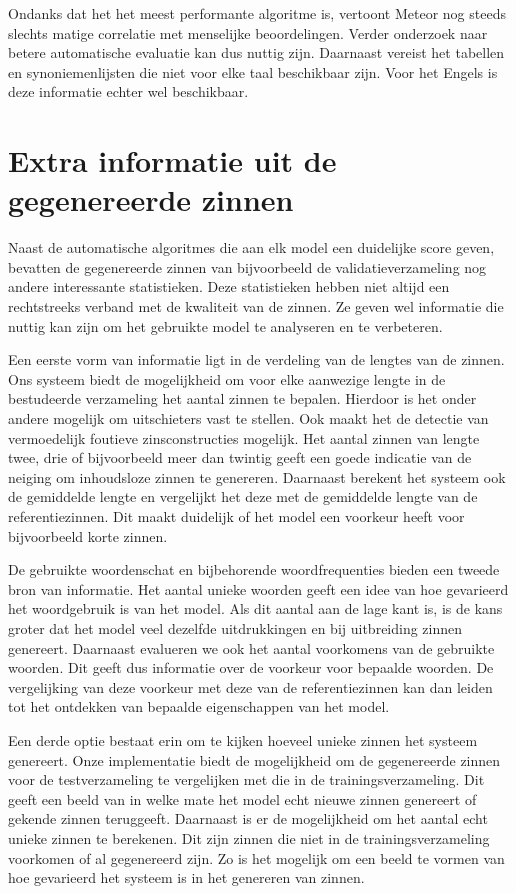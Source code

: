 Ondanks dat het het meest performante algoritme is, vertoont Meteor nog steeds slechts matige correlatie met menselijke beoordelingen. Verder onderzoek naar betere automatische evaluatie kan dus nuttig zijn. Daarnaast vereist het tabellen en synoniemenlijsten die niet voor elke taal beschikbaar zijn. Voor het Engels is deze informatie echter wel beschikbaar. 


\section{Extra informatie uit de gegenereerde zinnen}
Naast de automatische algoritmes die aan elk model een duidelijke score geven, bevatten de gegenereerde zinnen van bijvoorbeeld de validatieverzameling nog andere interessante statistieken. Deze statistieken hebben niet altijd een rechtstreeks verband met de kwaliteit van de zinnen. Ze geven wel informatie die nuttig kan zijn om het gebruikte model te analyseren en te verbeteren.

Een eerste vorm van informatie ligt in de verdeling van de lengtes van de zinnen. Ons systeem biedt de mogelijkheid om voor elke aanwezige lengte in de bestudeerde verzameling het aantal zinnen te bepalen. Hierdoor is het onder andere mogelijk om uitschieters vast te stellen. Ook maakt het de detectie van vermoedelijk foutieve zinsconstructies mogelijk. Het aantal zinnen van lengte twee, drie of bijvoorbeeld meer dan twintig geeft een goede indicatie van de neiging om inhoudsloze zinnen te genereren. Daarnaast berekent het systeem ook de gemiddelde lengte en vergelijkt het deze met de gemiddelde lengte van de referentiezinnen. Dit maakt duidelijk of het model een voorkeur heeft voor bijvoorbeeld korte zinnen.

De gebruikte woordenschat en bijbehorende woordfrequenties bieden een tweede bron van informatie. Het aantal unieke woorden geeft een idee van hoe gevarieerd het woordgebruik is van het model. Als dit aantal aan de lage kant is, is de kans groter dat het model veel dezelfde uitdrukkingen en bij uitbreiding zinnen genereert. Daarnaast evalueren we ook het aantal voorkomens van de gebruikte woorden. Dit geeft dus informatie over de voorkeur voor bepaalde woorden. De vergelijking van deze voorkeur met deze van de referentiezinnen kan dan leiden tot het ontdekken van bepaalde eigenschappen van het model.

Een derde optie bestaat erin om te kijken hoeveel unieke zinnen het systeem genereert. Onze implementatie biedt de mogelijkheid om de gegenereerde zinnen voor de testverzameling te vergelijken met die in de trainingsverzameling. Dit geeft een beeld van in welke mate het model echt nieuwe zinnen genereert of gekende zinnen teruggeeft. Daarnaast is er de mogelijkheid om het aantal echt unieke zinnen te berekenen. Dit zijn zinnen die niet in de trainingsverzameling voorkomen of al gegenereerd zijn. Zo is het mogelijk om een beeld te vormen van hoe gevarieerd het systeem is in het genereren van zinnen. 

